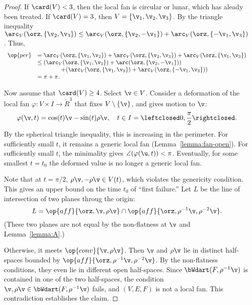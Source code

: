 \begin{proof}
If $\card(V) <3$, then the local fan is circular or lunar, which has
aleady been treated.  If $\card(V)=3$, then $V=\{\v_1,\v_2,\v_3\}$.
By the triangle inequality $\arc_V(\orz,\{\v_2,\v_3\}) \le
\arc_V(\orz,\{\v_2,-\v_1\})+\arc_V(\orz,\{-\v_1,\v_3\})$.  Thus,
\begin{displaymath}
\begin{array}{rll}
  \op{per} &=\arc_V(\orz,\{\v_1,\v_2\}) 
  + \arc_V(\orz,\{\v_2,\v_3\}) 
  + \arc_V(\orz,\{\v_1,\v_3\})\\
  &\le(\arc_V(\orz,\{\v_1,\v_2\})+\arc(\orz,\{\v_2,-\v_1\}))
  \\&\qquad\qquad+(\arc_V(\orz,\{\v_1,\v_3\})
+\arc_V(\orz,\{-\v_1,\v_3\})) \\
  &= \pi+\pi.
\end{array}
\end{displaymath}

Now assume that $\card(V)\ge 4$.  Select $\v\in V$.  Consider a
deformation of the local fan $\varphi:V\times I \to \ring{R}^3$ that
fixes $V\setminus\{\v\}$, and gives motion to $\v$:
\begin{displaymath}
\varphi(\v,t) = \cos(t) \v - \sin(t) \rho \v,\quad t \in I=\leftclosed0,\frac{\pi}{2}\rightclosed.
\end{displaymath}
By the spherical triangle inequality, this is increasing in the
perimeter.  For sufficiently small $t$, it remains a generic local fan
(Lemma~\ref{lemma:fan-open}).  For sufficiently small $t$, the
minimality gives $\angle(\varphi(\u,t))<\pi$.  Eventually, for some
smallest $t=t_0$ the deformed value is no longer a generic local fan.

Note that at $t=\pi/2$, $\rho\v,-\rho\v\in V(t)$, which violates the genericity condition.
This gives an upper bound on the time $t_0$ of ``first failure.''  
Let $L$ be the line of intersection of two planes throug the origin:
\begin{displaymath}
L= \op{aff}\{\orz,\v,\rho\v\}
\cap\op{aff}\{\orz,\rho^{-1}\v,\rho^{-2}\v\}.
\end{displaymath}
(These two planes are not equal by the non-flatness  at $\v$ and Lemma~\ref{lemma:A}.)

Otherwise, it meets $\op{conv}\{\v,\rho\v\}$.  Then $\v$ and $\rho\v$
lie in distinct half-spaces bounded by
$\op{aff}\{\orz,\rho^{-1}\v,\rho^{-2}\v\}$.  By the non-flatness conditions, they even
lie in different open half-spaces.  Since
$\bWdart(F,\rho^{-1}\v)$ is contained in one of the two  half-spaces,
the condition $\v,\rho\v\in \bWdart(F,\rho^{-1}\v)$ fails, and
$(V,E,F)$ is not a local fan.  This contradiction establishes the
claim.


\end{proof}
